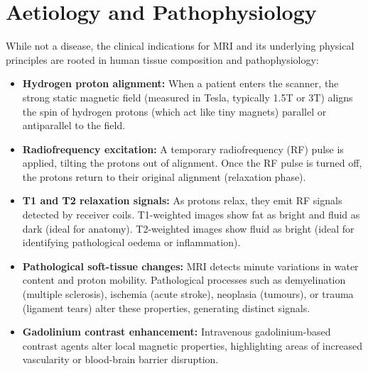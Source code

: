 \section*{Aetiology and Pathophysiology}
While not a disease, the clinical indications for MRI and its underlying physical principles are rooted in human tissue composition and pathophysiology:
\begin{itemize}
    \item \textbf{Hydrogen proton alignment:} When a patient enters the scanner, the strong static magnetic field (measured in Tesla, typically 1.5T or 3T) aligns the spin of hydrogen protons (which act like tiny magnets) parallel or antiparallel to the field.
    \item \textbf{Radiofrequency excitation:} A temporary radiofrequency (RF) pulse is applied, tilting the protons out of alignment. Once the RF pulse is turned off, the protons return to their original alignment (relaxation phase).
    \item \textbf{T1 and T2 relaxation signals:} As protons relax, they emit RF signals detected by receiver coils. T1-weighted images show fat as bright and fluid as dark (ideal for anatomy). T2-weighted images show fluid as bright (ideal for identifying pathological oedema or inflammation).
    \item \textbf{Pathological soft-tissue changes:} MRI detects minute variations in water content and proton mobility. Pathological processes such as demyelination (multiple sclerosis), ischemia (acute stroke), neoplasia (tumours), or trauma (ligament tears) alter these properties, generating distinct signals.
    \item \textbf{Gadolinium contrast enhancement:} Intravenous gadolinium-based contrast agents alter local magnetic properties, highlighting areas of increased vascularity or blood-brain barrier disruption.
\end{itemize}

